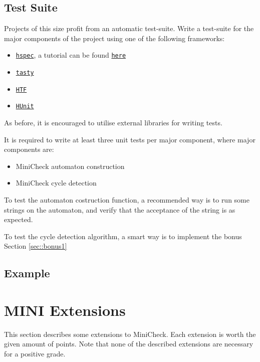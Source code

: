 \documentclass{article}
\begin{document}
\subsection{Test Suite}
Projects of this size profit from an automatic test-suite. 
Write a test-suite for the major components of the project using one of the following frameworks:

\begin{itemize}
\item \href{https://hackage.haskell.org/package/hspec}{\texttt{hspec}}, a tutorial can be found \href{https://hspec.github.io/}{\texttt{here}}
\item \href{https://hackage.haskell.org/package/tasty}{\texttt{tasty}}
\item \href{https://hackage.haskell.org/package/HTF}{\texttt{HTF}}
\item \href{https://hackage.haskell.org/package/HUnit}{\texttt{HUnit}}
\end{itemize}

As before, it is encouraged to utilise external libraries for writing tests.

It is required to write at least three unit tests per major component, where major components are:

\begin{itemize}
\item MiniCheck automaton construction
\item MiniCheck cycle detection
\end{itemize}

To test the automaton costruction function, a recommended way is to run some strings on the automaton, 
and verify that the acceptance of the string is as expected.

To test the cycle detection algorithm, a smart way is to implement the bonus Section \ref{sec::bonus1}

\subsection{Example} \label{subsec:example}

\section{MINI Extensions}
This section describes some extensions to MiniCheck. Each extension is worth the given amount of points. 
Note that none of the described extensions are necessary for a positive grade.
\end{document}
